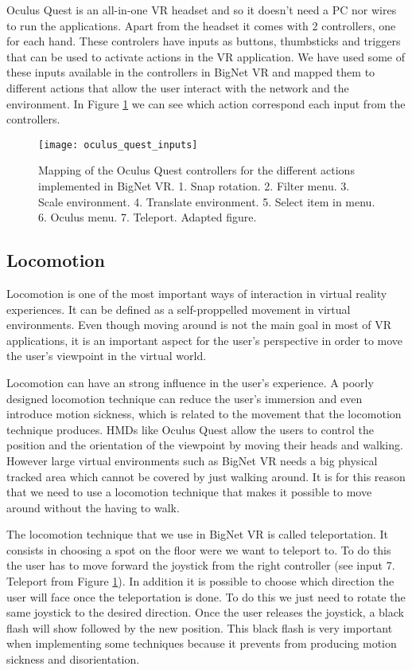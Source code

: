 Oculus Quest is an all-in-one VR headset and so it doesn't need a PC nor wires to run the applications. Apart from the headset it comes with 2 controllers, one for each hand. These controlers have inputs as buttons, thumbsticks and triggers that can be used to activate actions in the VR application. We have used some of these inputs available in the controllers in BigNet VR and mapped them to different actions that allow the user interact with the network and the environment. In Figure \ref{fig:oculus_quest_inputs} we can see which action correspond each input from the controllers.

\begin{figure}[h!]
    \centering%
    \texttt{[image: oculus\_quest\_inputs]}
    \caption{Mapping of the Oculus Quest controllers for the different actions implemented in BigNet VR. 1. Snap rotation. 2. Filter menu. 3. Scale environment. 4. Translate environment. 5. Select item in menu. 6. Oculus menu. 7. Teleport. Adapted figure.\cite{oculus_inputs}}
    \label{fig:oculus_quest_inputs}
\end{figure}%

\subsection{Locomotion}
Locomotion is one of the most important ways of interaction in virtual reality experiences. It can be defined as a self-proppelled movement in virtual environments. Even though moving around is not the main goal in most of VR applications, it is an important aspect for the user's perspective in order to move the user's viewpoint in the virtual world.

Locomotion can have an strong influence in the user's experience. A poorly designed locomotion technique can reduce the user's immersion and even introduce motion sickness, which is related to the movement that the locomotion technique produces. HMDs like Oculus Quest allow the users to control the position and the orientation of the viewpoint by moving their heads and walking. However large virtual environments such as BigNet VR needs a big physical tracked area which cannot be covered by just walking around. It is for this reason that we need to use a locomotion technique that makes it possible to move around without the having to walk\cite{locomotion_technique}.

The locomotion technique that we use in BigNet VR is called teleportation. It consists in choosing a spot on the floor were we want to teleport to. To do this the user has to move forward the joystick from the right controller (see input 7. Teleport from Figure \ref{fig:oculus_quest_inputs}). In addition it is possible to choose which direction the user will face once the teleportation is done. To do this we just need to rotate the same joystick to the desired direction. Once the user releases the joystick, a black flash will show followed by the new position. This black flash is very important when implementing some techniques because it prevents from producing motion sickness and disorientation.

